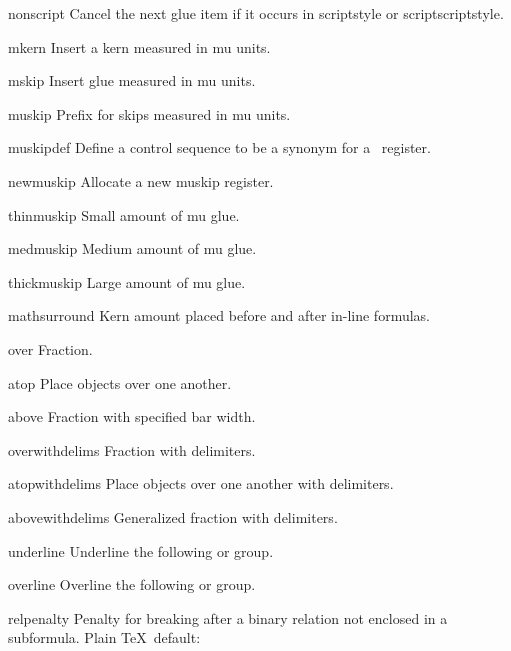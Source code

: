 \item nonscript 
      Cancel the next glue item if it occurs in 
      scriptstyle or scriptscriptstyle.

\item mkern 
      Insert a kern measured in mu units.

\item mskip 
      Insert glue measured in mu units.

\item muskip 
      Prefix for skips measured in mu units. 

\item muskipdef 
      Define a control sequence to be a synonym for
      a~ register.

\item newmuskip 
      Allocate a new muskip register.

\item thinmuskip 
      Small amount of mu glue.

\item medmuskip 
      Medium amount of mu glue.

\item thickmuskip 
      Large amount of mu glue. 

\item mathsurround 
      Kern amount placed before and after in-line formulas.

\item over
      Fraction.

\item atop
      Place objects over one another.

\item above
      Fraction with specified bar width. 

\item overwithdelims
      Fraction with delimiters.

\item atopwithdelims
      Place objects over one another with delimiters.

\item abovewithdelims
      Generalized fraction with delimiters.

\item underline 
      Underline the following  or group.

\item overline 
      Overline the following  or group.


\item relpenalty 
      Penalty for breaking after a binary relation
      not enclosed in a subformula.
      Plain \TeX\ default:~

